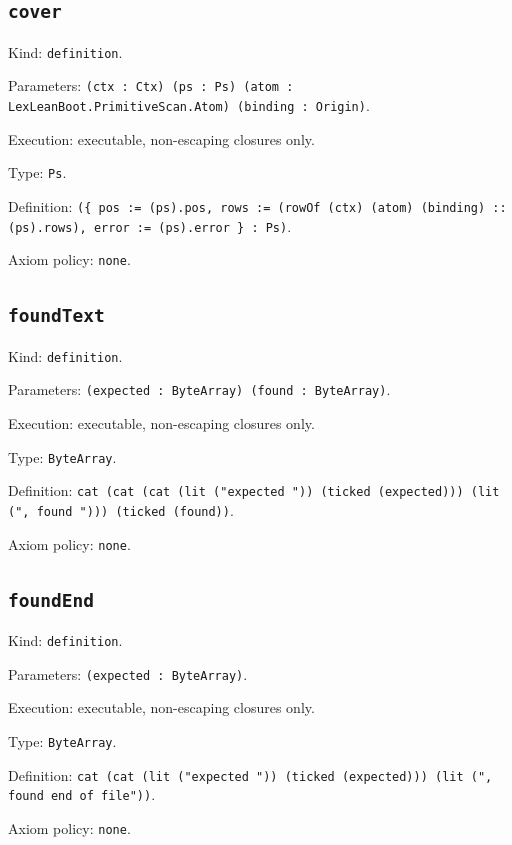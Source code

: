 \documentclass[11pt]{article}
\begin{document}
\subsection*{\texttt{cover}}
\noindent Kind: \texttt{definition}.\par
\noindent Parameters: \texttt{(ctx : Ctx) (ps : Ps) (atom : LexLeanBoot.PrimitiveScan.Atom) (binding : Origin)}.\par
\noindent Execution: executable, non-escaping closures only.\par
\noindent Type: \texttt{Ps}.\par
\noindent Definition: \texttt{(\{ pos := (ps).pos, rows := (rowOf (ctx) (atom) (binding) :: (ps).rows), error := (ps).error \} : Ps)}.\par
\noindent Axiom policy: \texttt{none}.\par
\subsection*{\texttt{foundText}}
\noindent Kind: \texttt{definition}.\par
\noindent Parameters: \texttt{(expected : ByteArray) (found : ByteArray)}.\par
\noindent Execution: executable, non-escaping closures only.\par
\noindent Type: \texttt{ByteArray}.\par
\noindent Definition: \texttt{cat (cat (cat (lit ("expected ")) (ticked (expected))) (lit (", found "))) (ticked (found))}.\par
\noindent Axiom policy: \texttt{none}.\par
\subsection*{\texttt{foundEnd}}
\noindent Kind: \texttt{definition}.\par
\noindent Parameters: \texttt{(expected : ByteArray)}.\par
\noindent Execution: executable, non-escaping closures only.\par
\noindent Type: \texttt{ByteArray}.\par
\noindent Definition: \texttt{cat (cat (lit ("expected ")) (ticked (expected))) (lit (", found end of file"))}.\par
\noindent Axiom policy: \texttt{none}.\par
\end{document}
